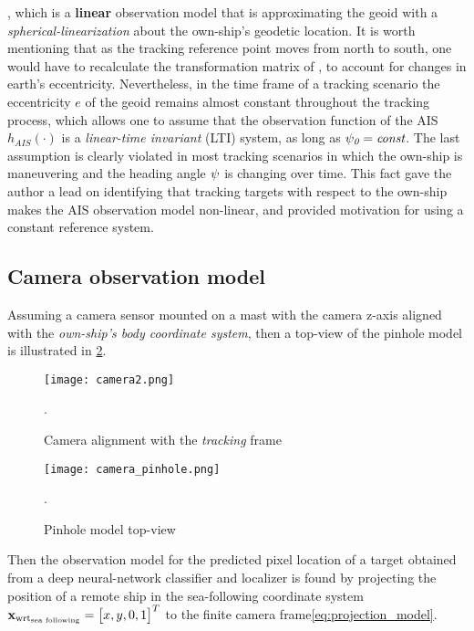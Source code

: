 , which is a \textbf{linear} observation model that is approximating the geoid with a \emph{spherical-linearization} about the own-ship's geodetic location. It is worth mentioning that as the tracking reference point moves from north to south, one would have to recalculate the transformation matrix of , to account for changes in earth's eccentricity. Nevertheless, in the time frame of a tracking scenario the eccentricity $e$ of the geoid remains almost constant throughout the tracking process, which allows one to assume that the observation function of the AIS $h_{\textit{AIS}}(\cdot)$ is a \emph{linear-time invariant} (LTI) system, as long as ${\psi}_{\textit{0}} = {\textit{const}} $. The last assumption is clearly violated in most tracking scenarios in which the own-ship is maneuvering and the heading angle ${\psi}$ is changing over time. This fact gave the author a lead on identifying that tracking targets with respect to the own-ship makes the $\text{AIS}$ observation model non-linear, and provided motivation for using a constant reference system.
\subsection{Camera observation model}


Assuming a camera sensor mounted on a mast with the camera z-axis aligned with the \emph{own-ship's body coordinate system}, then a top-view of the pinhole model is illustrated in \cref{fig:camera_pinhole}.



\begin{figure}[H]
	\centering
	\texttt{[image: camera2.png]}
	\caption{Camera alignment with the \emph{tracking} frame}.
	\label{fig:camera_alignment_tracking}
\end{figure}




\begin{figure}[H]
	\centering
	\texttt{[image: camera\_pinhole.png]}
	\caption{Pinhole model top-view}.
	\label{fig:camera_pinhole}
\end{figure}


Then the observation model for the predicted pixel location of a target obtained from a deep neural-network classifier and localizer is found by projecting the position of a remote ship in the sea-following coordinate system $\mathbf{x}_{\text{wrt}_{\text{sea following}}}=\begin{bmatrix}x, y, 0, 1\end{bmatrix}^T$ to the finite camera frame\eqref{eq:projection_model}.

